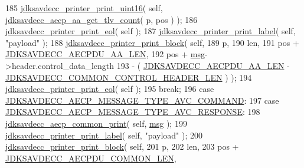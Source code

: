\begin{DoxyCode}
185         \hyperlink{group__util_ga9793e0ff8e7ed25d957282ee6b257ce2}{jdksavdecc\_printer\_print\_uint16}( \textcolor{keyword}{self}, 
      \hyperlink{group___a_e_c_p___a_a_ga9bbfb30ebe22ee886ac1b783d64bd1aa}{jdksavdecc\_aecp\_aa\_get\_tlv\_count}( p, pos ) );
186         \hyperlink{group__util_gacda56c9d3d24593a52c999682fa6e6e3}{jdksavdecc\_printer\_print\_eol}( \textcolor{keyword}{self} );
187         \hyperlink{group__util_gaf7818b24143b3c7502926a425a242ff5}{jdksavdecc\_printer\_print\_label}( \textcolor{keyword}{self}, \textcolor{stringliteral}{"payload"} );
188         \hyperlink{group__util_ga18d7b11e396f21996dedde77febcb22f}{jdksavdecc\_printer\_print\_block}( \textcolor{keyword}{self},
189                                         p,
190                                         len,
191                                         pos + \hyperlink{group___a_e_c_p___a_a__offsets_ga624792b524d0f0f8ef18c2f4895003aa}{JDKSAVDECC\_AECPDU\_AA\_LEN},
192                                         pos + \hyperlink{maap__log__linux_8c_a0c7e58a50354c4a4d6dad428d0e47029}{msg}->header.control\_data\_length
193                                         - ( \hyperlink{group___a_e_c_p___a_a__offsets_ga624792b524d0f0f8ef18c2f4895003aa}{JDKSAVDECC\_AECPDU\_AA\_LEN} - 
      \hyperlink{group__jdksavdecc__avtp__common__control__header_gaae84052886fb1bb42f3bc5f85b741dff}{JDKSAVDECC\_COMMON\_CONTROL\_HEADER\_LEN} ) );
194         \hyperlink{group__util_gacda56c9d3d24593a52c999682fa6e6e3}{jdksavdecc\_printer\_print\_eol}( \textcolor{keyword}{self} );
195         \textcolor{keywordflow}{break};
196     \textcolor{keywordflow}{case} \hyperlink{group__aecp__message__type_gad297a615335f7d70d49993a0ee220dfd}{JDKSAVDECC\_AECP\_MESSAGE\_TYPE\_AVC\_COMMAND}:
197     \textcolor{keywordflow}{case} \hyperlink{group__aecp__message__type_gaa1d24ecbbabf5293fb3753a413a7ec8d}{JDKSAVDECC\_AECP\_MESSAGE\_TYPE\_AVC\_RESPONSE}:
198         \hyperlink{group__aecp__print_gabf23e817595afca199205bb410a5eca6}{jdksavdecc\_aecp\_common\_print}( \textcolor{keyword}{self}, \hyperlink{maap__log__linux_8c_a0c7e58a50354c4a4d6dad428d0e47029}{msg} );
199         \hyperlink{group__util_gaf7818b24143b3c7502926a425a242ff5}{jdksavdecc\_printer\_print\_label}( \textcolor{keyword}{self}, \textcolor{stringliteral}{"payload"} );
200         \hyperlink{group__util_ga18d7b11e396f21996dedde77febcb22f}{jdksavdecc\_printer\_print\_block}( \textcolor{keyword}{self},
201                                         p,
202                                         len,
203                                         pos + \hyperlink{group__aecpdu_ga1311febb873dfac7b4035ed25460f9d1}{JDKSAVDECC\_AECPDU\_COMMON\_LEN},

\end{DoxyCode}
